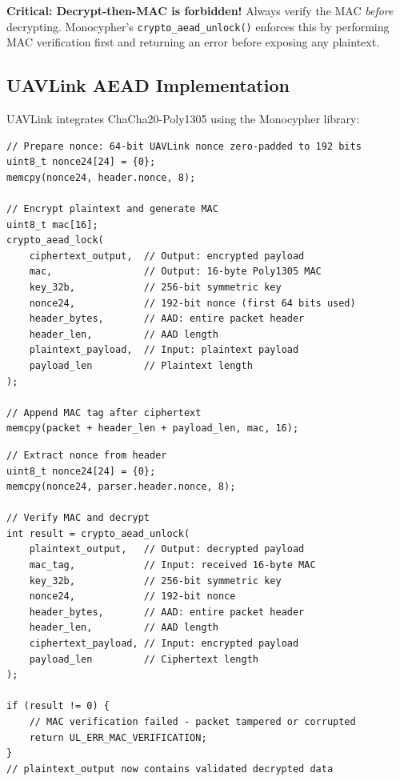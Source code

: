 \documentclass[11pt,a4paper]{article}
\begin{document}
\begin{warnbox}
\textbf{Critical: Decrypt-then-MAC is forbidden!} Always verify the MAC \emph{before} decrypting. Monocypher's \texttt{crypto\_aead\_unlock()} enforces this by performing MAC verification first and returning an error before exposing any plaintext.
\end{warnbox}

\subsection{UAVLink AEAD Implementation}

UAVLink integrates ChaCha20-Poly1305 using the Monocypher library:

\begin{lstlisting}[caption={UAVLink Encryption (uavlink\_pack)}]
// Prepare nonce: 64-bit UAVLink nonce zero-padded to 192 bits
uint8_t nonce24[24] = {0};
memcpy(nonce24, header.nonce, 8);

// Encrypt plaintext and generate MAC
uint8_t mac[16];
crypto_aead_lock(
    ciphertext_output,  // Output: encrypted payload
    mac,                // Output: 16-byte Poly1305 MAC
    key_32b,            // 256-bit symmetric key
    nonce24,            // 192-bit nonce (first 64 bits used)
    header_bytes,       // AAD: entire packet header
    header_len,         // AAD length
    plaintext_payload,  // Input: plaintext payload
    payload_len         // Plaintext length
);

// Append MAC tag after ciphertext
memcpy(packet + header_len + payload_len, mac, 16);
\end{lstlisting}

\begin{lstlisting}[caption={UAVLink Decryption (ul\_parse\_char)}]
// Extract nonce from header
uint8_t nonce24[24] = {0};
memcpy(nonce24, parser.header.nonce, 8);

// Verify MAC and decrypt
int result = crypto_aead_unlock(
    plaintext_output,   // Output: decrypted payload
    mac_tag,            // Input: received 16-byte MAC
    key_32b,            // 256-bit symmetric key
    nonce24,            // 192-bit nonce
    header_bytes,       // AAD: entire packet header
    header_len,         // AAD length
    ciphertext_payload, // Input: encrypted payload
    payload_len         // Ciphertext length
);

if (result != 0) {
    // MAC verification failed - packet tampered or corrupted
    return UL_ERR_MAC_VERIFICATION;
}
// plaintext_output now contains validated decrypted data
\end{lstlisting}
\end{document}
